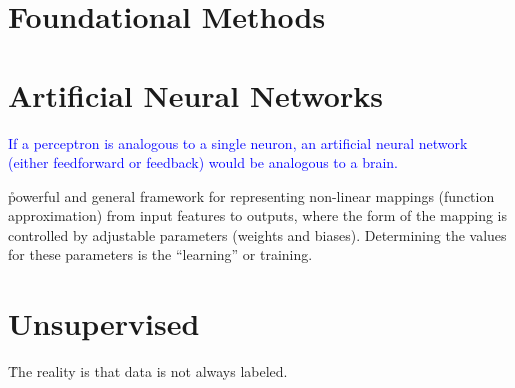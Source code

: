 \chapter{Foundational Methods}















\chapter{Artificial Neural Networks}

\textcolor{blue}{If a perceptron is analogous to a single neuron, an artificial neural network (either feedforward or feedback) would be analogous to a brain.}

\r{powerful and general framework for representing non-linear mappings (function approximation) from input features to outputs, where the form of the mapping is controlled by adjustable parameters (weights and biases). Determining the values for these parameters is the ``learning'' or training.}










\chapter{Unsupervised}

\r{The reality is that data is not always labeled.}

